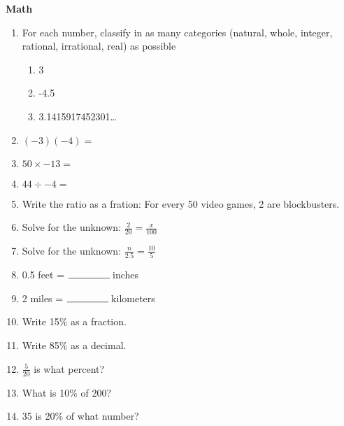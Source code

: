 \documentclass[12pt,onecolumn]{article}
\newenvironment{menumerate}{\begin{enumerate}\addtolength{\itemsep}{1.0em}}{\end{enumerate}}
\newcommand{\fiblank}{$\rule{1.5cm}{0.15mm}\:$}
\begin{document}
\graphicspath{{images/}}

\centerline{{\Large {\bf Math}}}


\begin{menumerate}
\item For each number, classify in as many categories (natural, whole, integer, rational, irrational, real) as possible
  \begin{menumerate}
  \item 3
  \item -4.5
  \item 3.1415917452301\ldots
  \end{menumerate}
  \item $(-3)(-4)=$
  \item $50 \times -13 = $
  \item $ 44  \div -4 = $
  \item Write the ratio as a fration: For every 50 video games, 2 are blockbusters.
  \item Solve for the unknown: $ \frac{2}{20} = \frac{x}{100}$
    \item Solve for the unknown: $\frac{n}{2.5}=\frac{10}{5}$
  \item 0.5 feet = \fiblank inches
  \item 2 miles = \fiblank kilometers
  \item Write 15\% as a fraction.
  \item Write 85\% as a decimal.
  \item $\frac{5}{20}$ is what percent?
  \item What is 10\% of 200?
  \item 35 is 20\% of what number?  
  \end{menumerate}
\end{document}
